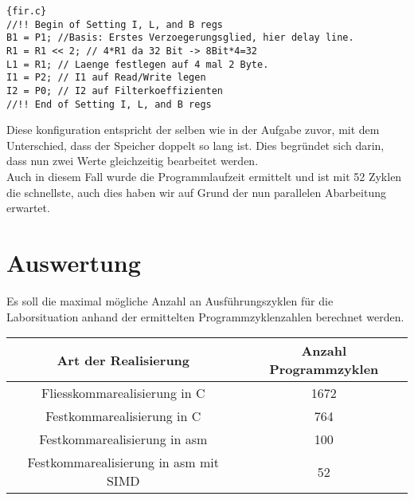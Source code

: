 \begin{adjustbox}{width=\textwidth,height=\textheight,keepaspectratio}
 \begin{lstlisting}[title=fir.c]{fir.c}
//!! Begin of Setting I, L, and B regs	
B1 = P1; //Basis: Erstes Verzoegerungsglied, hier delay line.
R1 = R1 << 2; // 4*R1 da 32 Bit -> 8Bit*4=32
L1 = R1; // Laenge festlegen auf 4 mal 2 Byte.
I1 = P2; // I1 auf Read/Write legen
I2 = P0; // I2 auf Filterkoeffizienten
//!! End of Setting I, L, and B regs
\end{lstlisting}
\end{adjustbox}
Diese konfiguration entspricht der selben wie in der Aufgabe zuvor, mit dem Unterschied, dass der Speicher doppelt so lang ist. Dies begr\"undet sich darin, dass nun zwei Werte gleichzeitig bearbeitet werden.\\
Auch in diesem Fall wurde die Programmlaufzeit ermittelt und ist mit 52 Zyklen die schnellste, auch dies haben wir auf Grund der nun parallelen Abarbeitung erwartet.



\section{Auswertung}
Es soll die maximal m\"ogliche Anzahl an Ausf\"uhrungszyklen für die Laborsituation anhand der ermittelten Programmzyklenzahlen berechnet werden.\\
\begin{tabular}{|c|c|}
\hline 
Art der Realisierung & Anzahl Programmzyklen \\ 
\hline 
Fliesskommarealisierung in C & 1672 \\ 
\hline 
Festkommarealisierung in C & 764 \\ 
\hline 
Festkommarealisierung in asm & 100 \\ 
\hline 
Festkommarealisierung in asm mit SIMD & 52 \\ 
\hline 
\end{tabular} 

